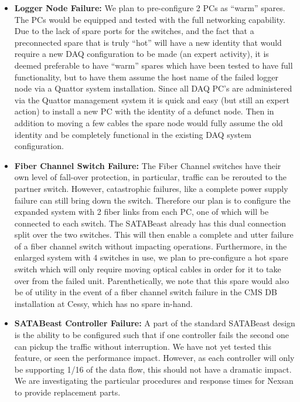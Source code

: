 \begin{itemize} 
\item {\bf Logger Node Failure:} We plan to pre-configure 2 PCs as ``warm'' spares.
The PCs would be equipped and tested with the full networking capability.
Due to the lack of spare ports for the switches, and the fact that
a preconnected spare that is truly ``hot'' will have a new identity
that would require a new DAQ configuration to be made (an expert activity),
it is deemed preferable to have ``warm'' spares which have been tested
to have full functionality, but to have them assume the host name of the
failed logger node via a Quattor system installation.
Since all DAQ PC's are administered via the Quattor management system
it is quick and easy (but still an expert action) to install a new PC with
the identity of a defunct node.
Then in addition to moving a few cables the spare node would fully assume
the old identity and be completely
functional in the existing DAQ system configuration. 

\item {\bf Fiber Channel Switch Failure:} The Fiber Channel switches have 
their own level of fall-over protection, in particular, traffic can
be rerouted to the partner switch.
However, catastrophic failures, like a complete power supply failure
can still bring down the switch.
Therefore our plan is to configure the expanded system with 2 fiber links
from each PC, one of which will be connected to each switch.
The SATABeast already has this dual connection split over the two switches.
This will then enable a complete and utter failure of a fiber channel
switch without impacting operations.
Furthermore, in the enlarged system with 4 switches in use, we plan to
pre-configure a hot spare switch which will only require moving optical
cables in order for it to take over from the failed unit.
Parenthetically, we note that this spare would also be of utility
in the event of a fiber channel switch failure in the CMS DB
installation at Cessy,  which has no spare in-hand.

\item {\bf SATABeast Controller Failure:} A part of the standard SATABeast 
design is the ability to be configured such that if one controller fails the second 
one can pickup the traffic without interruption.
We have not yet tested this feature, or seen the performance impact.
However, as each controller will only be supporting 1/16 of the data flow,
this should not have a dramatic impact.
We are investigating the particular procedures and response times
for Nexsan to provide replacement parts.


\end{itemize}
